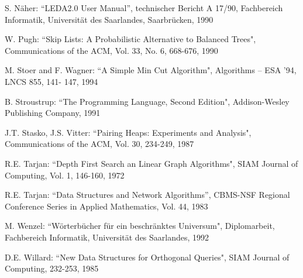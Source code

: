 \begin{thebibliography}{99}
S. N\"aher:
``LEDA2.0  User Manual'',
technischer Bericht A 17/90, Fachbereich Informatik,
Universit\"at des Saarlandes, Saarbr\"ucken, 1990

{W. Pugh: ``Skip Lists: A Probabilistic Alternative to Balanced Trees",
 Communications of the ACM, Vol. 33, No. 6, 668-676, 1990} 

{M. Stoer and F. Wagner: ``A Simple Min Cut Algorithm",
 Algorithms -- ESA '94, LNCS 855, 141- 147, 1994}

{B. Stroustrup: ``The \CC Programming Language, Second Edition", 
Addison-Wesley Publishing Company, 1991}

{J.T. Stasko, J.S. Vitter: ``Pairing Heaps: Experiments and Analysis",
 Communications of the ACM, Vol. 30, 234-249, 1987}

{R.E. Tarjan: ``Depth First Search an Linear Graph Algorithms", SIAM Journal
 of Computing, Vol. 1, 146-160, 1972}

{R.E. Tarjan: ``Data Structures and Network Algorithms'',
CBMS-NSF Regional Conference Series in Applied Mathematics,
Vol. 44, 1983}

{M. Wenzel: ``W\"orterb\"ucher f\"ur ein beschr\"anktes Universum",
Diplomarbeit, Fachbereich Informatik, Universit\"at des Saarlandes,
1992}

{D.E. Willard: ``New Data Structures for Orthogonal Queries", SIAM Journal
of Computing, 232-253, 1985}

\end{thebibliography}
